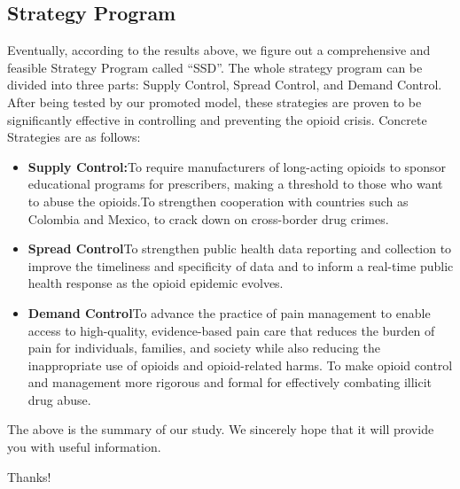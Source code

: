 \documentclass{mcmthesis}
\begin{document}
\subsection*{Strategy Program}
Eventually, according to the results above, we figure out a comprehensive and feasible Strategy Program called ``SSD''. The whole strategy program can be divided into three parts: Supply Control, Spread Control, and Demand Control. After being tested by our promoted model, these strategies are proven to be significantly effective in controlling and preventing the opioid crisis. Concrete Strategies are as follows:
\begin{itemize}
    \item \textbf{Supply Control:}To require manufacturers of long-acting opioids to sponsor educational programs for prescribers, making a threshold to those who want to abuse the opioids.To strengthen cooperation with countries such as Colombia and Mexico, to crack down on cross-border drug crimes.
    \item \textbf{ Spread Control}To strengthen public health data reporting and collection to improve the timeliness and specificity of data and to inform a real-time public health response as the opioid epidemic evolves.
    \item \textbf{Demand Control}To advance the practice of pain management to enable access to high-quality, evidence-based pain care that reduces the burden of pain for individuals, families, and society while also reducing the inappropriate use of opioids and opioid-related harms. To make opioid control and management more rigorous and formal for effectively combating illicit drug abuse.
\end{itemize}


The above is the summary of our study. We sincerely hope that it will provide you with useful information.

Thanks!

\newpage



	
\ \newpage
\end{document}
